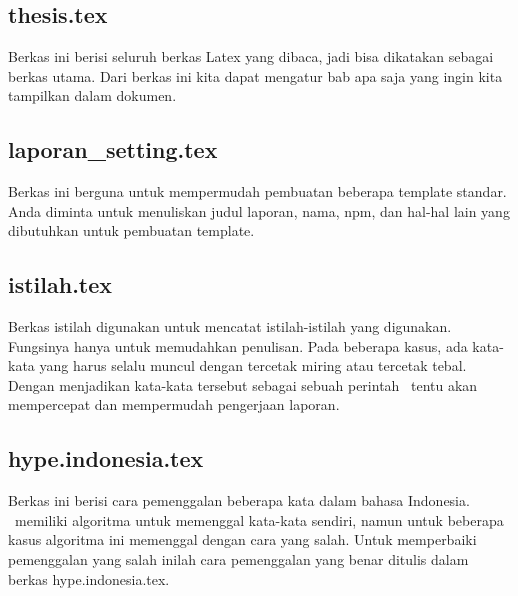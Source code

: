 \chapter{\babEmpat}

\section{thesis.tex}
Berkas ini berisi seluruh berkas Latex yang dibaca, jadi bisa dikatakan sebagai 
berkas utama. Dari berkas ini kita dapat mengatur bab apa saja yang ingin 
kita tampilkan dalam dokumen.


\section{laporan\_setting.tex}
Berkas ini berguna untuk mempermudah pembuatan beberapa template standar. 
Anda diminta untuk menuliskan judul laporan, nama, npm, dan hal-hal lain yang 
dibutuhkan untuk pembuatan template. 


\section{istilah.tex}
Berkas istilah digunakan untuk mencatat istilah-istilah yang digunakan. 
Fungsinya hanya untuk memudahkan penulisan.
Pada beberapa kasus, ada kata-kata yang harus selalu muncul dengan tercetak 
miring atau tercetak tebal. 
Dengan menjadikan kata-kata tersebut sebagai sebuah perintah \latex~tentu akan 
mempercepat dan mempermudah pengerjaan laporan. 


\section{hype.indonesia.tex}
Berkas ini berisi cara pemenggalan beberapa kata dalam bahasa Indonesia. 
\latex~memiliki algoritma untuk memenggal kata-kata sendiri, namun untuk 
beberapa kasus algoritma ini memenggal dengan cara yang salah. 
Untuk memperbaiki pemenggalan yang salah inilah cara pemenggalan yang benar 
ditulis dalam berkas hype.indonesia.tex.


